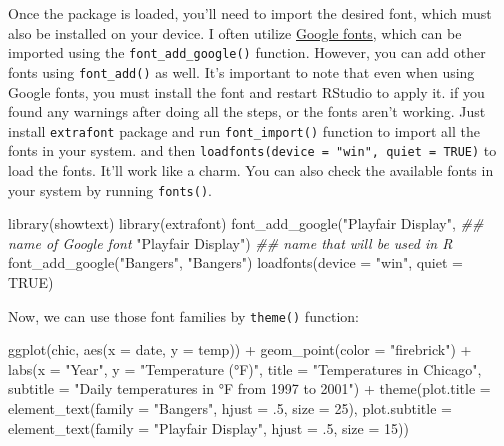 \documentclass[
  letterpaper,
]{scrbook}
\newenvironment{Shaded}{\begin{snugshade}}{\end{snugshade}}
\newcommand{\AttributeTok}[1]{\textcolor[rgb]{0.40,0.45,0.13}{#1}}
\newcommand{\ConstantTok}[1]{\textcolor[rgb]{0.56,0.35,0.01}{#1}}
\newcommand{\DecValTok}[1]{\textcolor[rgb]{0.68,0.00,0.00}{#1}}
\newcommand{\DocumentationTok}[1]{\textcolor[rgb]{0.37,0.37,0.37}{\textit{#1}}}
\newcommand{\FunctionTok}[1]{\textcolor[rgb]{0.28,0.35,0.67}{#1}}
\newcommand{\NormalTok}[1]{\textcolor[rgb]{0.00,0.23,0.31}{#1}}
\newcommand{\SpecialCharTok}[1]{\textcolor[rgb]{0.37,0.37,0.37}{#1}}
\newcommand{\StringTok}[1]{\textcolor[rgb]{0.13,0.47,0.30}{#1}}
\begin{document}
Once the package is loaded, you'll need to import the desired font,
which must also be installed on your device. I often utilize
\href{https://fonts.google.com/}{Google fonts}, which can be imported
using the \texttt{font\_add\_google()} function. However, you can add
other fonts using \texttt{font\_add()} as well. It's important to note
that even when using Google fonts, you must install the font and restart
RStudio to apply it. if you found any warnings after doing all the
steps, or the fonts aren't working. Just install \texttt{extrafont}
package and run \texttt{font\_import()} function to import all the fonts
in your system. and then
\texttt{loadfonts(device\ =\ "win",\ quiet\ =\ TRUE)} to load the fonts.
It'll work like a charm. You can also check the available fonts in your
system by running \texttt{fonts()}.

\begin{Shaded}
\begin{Highlighting}[]
\FunctionTok{library}\NormalTok{(showtext)}
\FunctionTok{library}\NormalTok{(extrafont)}
\FunctionTok{font\_add\_google}\NormalTok{(}\StringTok{"Playfair Display"}\NormalTok{, }\DocumentationTok{\#\# name of Google font}
                \StringTok{"Playfair Display"}\NormalTok{)  }\DocumentationTok{\#\# name that will be used in R}
\FunctionTok{font\_add\_google}\NormalTok{(}\StringTok{"Bangers"}\NormalTok{, }\StringTok{"Bangers"}\NormalTok{)}
\FunctionTok{loadfonts}\NormalTok{(}\AttributeTok{device =} \StringTok{"win"}\NormalTok{, }\AttributeTok{quiet =} \ConstantTok{TRUE}\NormalTok{)}
\end{Highlighting}
\end{Shaded}

Now, we can use those font families by \texttt{theme()} function:

\begin{Shaded}
\begin{Highlighting}[]
\FunctionTok{ggplot}\NormalTok{(chic, }\FunctionTok{aes}\NormalTok{(}\AttributeTok{x =}\NormalTok{ date, }\AttributeTok{y =}\NormalTok{ temp)) }\SpecialCharTok{+}
  \FunctionTok{geom\_point}\NormalTok{(}\AttributeTok{color =} \StringTok{"firebrick"}\NormalTok{) }\SpecialCharTok{+}
  \FunctionTok{labs}\NormalTok{(}\AttributeTok{x =} \StringTok{"Year"}\NormalTok{, }\AttributeTok{y =} \StringTok{"Temperature (°F)"}\NormalTok{,}
       \AttributeTok{title =} \StringTok{"Temperatures in Chicago"}\NormalTok{,}
       \AttributeTok{subtitle =} \StringTok{"Daily temperatures in °F from 1997 to 2001"}\NormalTok{) }\SpecialCharTok{+}
  \FunctionTok{theme}\NormalTok{(}\AttributeTok{plot.title =} \FunctionTok{element\_text}\NormalTok{(}\AttributeTok{family =} \StringTok{"Bangers"}\NormalTok{, }\AttributeTok{hjust =}\NormalTok{ .}\DecValTok{5}\NormalTok{, }\AttributeTok{size =} \DecValTok{25}\NormalTok{),}
        \AttributeTok{plot.subtitle =} \FunctionTok{element\_text}\NormalTok{(}\AttributeTok{family =} \StringTok{"Playfair Display"}\NormalTok{, }\AttributeTok{hjust =}\NormalTok{ .}\DecValTok{5}\NormalTok{, }\AttributeTok{size =} \DecValTok{15}\NormalTok{))}
\end{Highlighting}
\end{Shaded}
\end{document}
